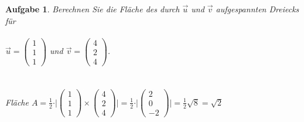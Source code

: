 \documentclass[12pt]{article}
\newtheorem{exercise}[satz]{Aufgabe}
\begin{document}
\begin{exercise}
  Berechnen Sie die Fl\"ache des durch $\vec{u}$ und $\vec{v}$ aufgespannten Dreiecks f\"ur \, \\ \\
  $\vec{u}=\left(\begin{array}{r} 1 \\ 1 \\ 1 \end{array}\right)$ und
  $\vec{v}=\left(\begin{array}{r} 4 \\ 2 \\ 4 \end{array}\right)$.\\ \\ \\
  Fl\"ache 
  $A = \frac{1}{2}\cdot\vert \left(\begin{array}{r} 1 \\ 1 \\ 1 \end{array}\right)\times \left(\begin{array}{r} 4 \\ 2 \\ 4 \end{array}\right) \vert
  = \frac{1}{2}\cdot\vert \left(\begin{array}{r} 2 \\ 0 \\ -2 \end{array}\right)\vert
  = \frac{1}{2} \sqrt{8} = \sqrt{2}$\\ \\

\end{exercise}
\end{document}
